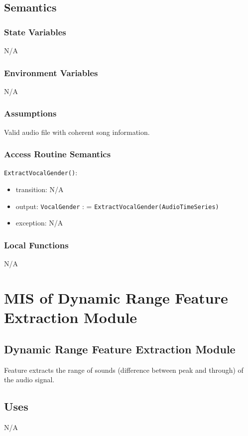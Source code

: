 \documentclass[12pt, titlepage]{article}
\begin{document}
\subsection{Semantics}

\subsubsection{State Variables}
N/A

\subsubsection{Environment Variables}
N/A

\subsubsection{Assumptions}
Valid audio file with coherent song information.

\subsubsection{Access Routine Semantics}

\noindent \texttt{ExtractVocalGender()}:
\begin{itemize}
\item transition: N/A
\item output: \texttt{Vocal\textunderscore Gender} : = \texttt{ExtractVocalGender(Audio\textunderscore Time\textunderscore Series)}
\item exception: N/A
\end{itemize}

\subsubsection{Local Functions}
N/A

\section{MIS of Dynamic Range Feature Extraction Module} 

\subsection{Dynamic Range Feature Extraction Module}
Feature extracts the range of sounds (difference between peak and through) of the audio signal.

\subsection{Uses}
N/A
\end{document}
